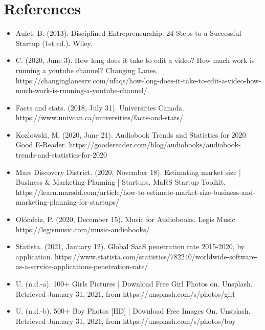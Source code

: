 \documentclass[letterpaper]{article}
\begin{document}
\section{References}
\begin{itemize}
    \item Aulet, B. (2013). Disciplined Entrepreneurship: 24 Steps to a Successful Startup (1st ed.). Wiley.
    \item C. (2020, June 3). How long does it take to edit a video? How much work is running a youtube channel? Changing Lanes. https://changinglanesrv.com/ufaqs/how-long-does-it-take-to-edit-a-video-how-much-work-is-running-a-youtube-channel/.
    \item Facts and stats. (2018, July 31). Universities Canada. https://www.univcan.ca/universities/facts-and-stats/
    \item Kozlowski, M. (2020, June 21). Audiobook Trends and Statistics for 2020. Good E-Reader. https://goodereader.com/blog/audiobooks/audiobook-trends-and-statistics-for-2020
    \item Mars Discovery District. (2020, November 18). Estimating market size | Business \& Marketing Planning | Startups. MaRS Startup Toolkit. https://learn.marsdd.com/article/how-to-estimate-market-size-business-and-marketing-planning-for-startups/
    \item Olóndriz, P. (2020, December 15). Music for Audiobooks. Legis Music. https://legismusic.com/music-audiobooks/
    \item Statista. (2021, January 12). Global SaaS penetration rate 2015-2020, by application. https://www.statista.com/statistics/782240/worldwide-software-as-a-service-applications-penetration-rate/
    \item U. (n.d.-a). 100+ Girls Pictures | Download Free Girl Photos on. Unsplash. Retrieved January 31, 2021, from https://unsplash.com/s/photos/girl
    \item U. (n.d.-b). 500+ Boy Photos [HD] | Download Free Images On. Unsplash. Retrieved January 31, 2021, from https://unsplash.com/s/photos/boy
\end{itemize}
\end{document}

